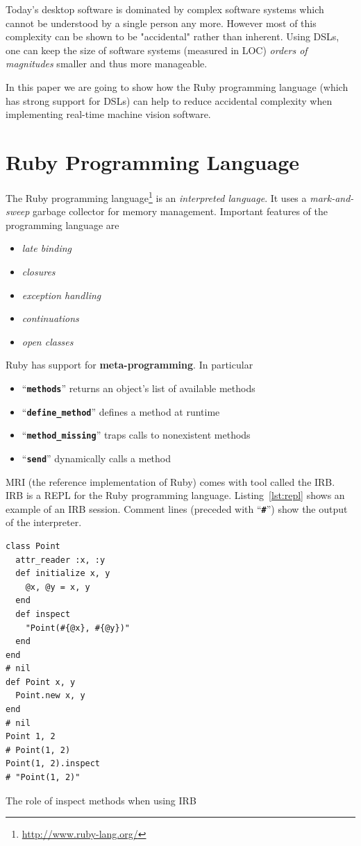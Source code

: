 \documentclass[10pt,journal,compsoc]{joser1}
\newcommand{\code}[1]{``\texttt{\textbf{\textcolor{codegray}{\small{#1}}}}''}
\newcommand{\lst}[1]{Listing~\ref{lst:#1}}
\begin{document}
Today's desktop software is dominated by complex software systems which cannot
be understood by a single person any more. However most of this complexity can
be shown to be "accidental" rather than inherent\citep{ohshima2013kscript}.
Using \acp{DSL}, one can keep the size of software systems (measured in LOC)
\emph{orders of magnitudes} smaller and thus more
manageable\citep{kay2010steps}.

In this paper we are going to show how the Ruby programming language (which has
strong support for DSLs) can help to reduce accidental complexity when
implementing real-time machine vision software.

\section{Ruby Programming Language}
The Ruby programming language\footnote{\url{http://www.ruby-lang.org/}} is an
\emph{interpreted language}. It uses a \emph{mark-and-sweep} garbage collector
for memory management. Important features of the programming language are
\begin{itemize}
  \item \emph{late binding}
  \item \emph{closures}
  \item \emph{exception handling}
  \item \emph{continuations}
  \item \emph{open classes}
\end{itemize}

Ruby has support for \textbf{meta-programming}. In particular
\begin{itemize}
  \item \code{methods} returns an object's list of available methods
  \item \code{define\_method} defines a method at runtime
  \item \code{method\_missing} traps calls to nonexistent methods
  \item \code{send} dynamically calls a method
\end{itemize}

\ac{MRI} (the reference implementation of Ruby) comes with tool called the
\ac{IRB}. \ac{IRB} is a \ac{REPL} for the Ruby programming language. \lst{repl}
shows an example of an \ac{IRB} session. Comment lines (preceded with \code{\#}) show the output of the interpreter.
\begin{listing}[htbp]
  \begin{verbatim}
class Point
  attr_reader :x, :y
  def initialize x, y
    @x, @y = x, y
  end
  def inspect
    "Point(#{@x}, #{@y})"
  end
end
# nil
def Point x, y
  Point.new x, y
end
# nil
Point 1, 2
# Point(1, 2)
Point(1, 2).inspect
# "Point(1, 2)"
  \end{verbatim}
  \caption{The role of inspect methods when using IRB\label{lst:repl}}
\end{listing}
\end{document}
